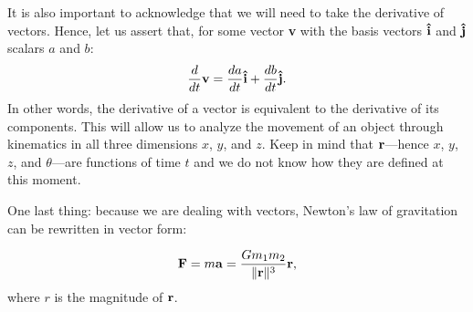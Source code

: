 It is also important to acknowledge that we will need to take the derivative of vectors. Hence, let us assert that, for some vector \textbf{v} with the basis vectors $\uvec{i}$ and $\uvec{j}$ scalars $a$ and $b$:
\begin{equation*}
	\frac{d}{dt}\bvec{v} = \frac{da}{dt}\uvec{i} + \frac{db}{dt}\uvec{j} \text{.}
\end{equation*}
In other words, the derivative of a vector is equivalent to the derivative of its components.
This will allow us to analyze the movement of an object through kinematics in all three dimensions $x$, $y$, and $z$. Keep in mind that $\bm{\mathbf{r}}$---hence $x$, $y$, $z$, and $\theta$---are functions of time $t$ and we do not know how they are defined at this moment.

\newpage

One last thing: because we are dealing with vectors, Newton's law of gravitation can be rewritten in vector form:

\begin{equation*}
	\bm{\mathbf{F}} = m\bm{\mathbf{a}} = \frac{Gm_1m_2}{\|\bm{\mathbf{r}}\|^3}\bm{\mathbf{r}} \text{,}
\end{equation*}
where $r$ is the magnitude of $\bm{\mathbf{r}}$.

